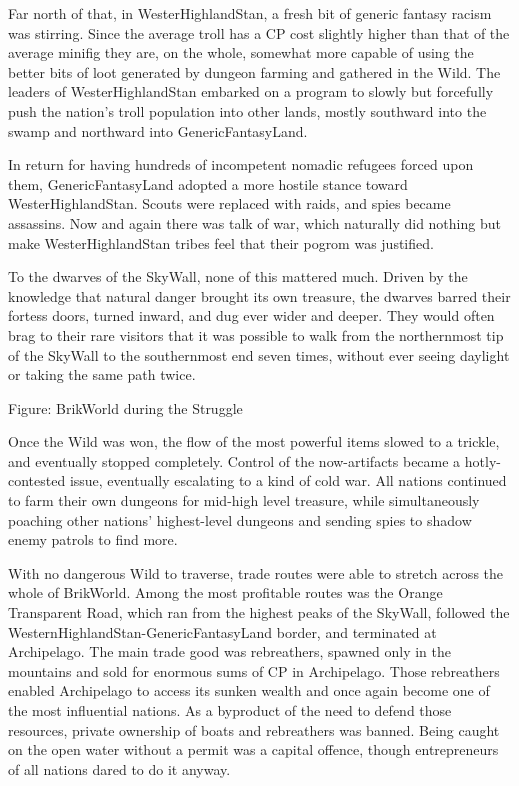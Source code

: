 \documentclass[12pt,a4paper,twocolumn]{article}
\begin{document}
Far north of that, in WesterHighlandStan, a fresh bit of generic fantasy racism was stirring.  Since the average troll has a CP cost slightly higher than that of the average minifig they are, on the whole, somewhat more capable of using the better bits of loot generated by dungeon farming and gathered in the Wild.  The leaders of WesterHighlandStan embarked on a program to slowly but forcefully push the nation's troll population into other lands, mostly southward into the swamp and northward into GenericFantasyLand.

In return for having hundreds of incompetent nomadic refugees forced upon them, GenericFantasyLand adopted a more hostile stance toward WesterHighlandStan.  Scouts were replaced with raids, and spies became assassins.  Now and again there was talk of war, which naturally did nothing but make WesterHighlandStan tribes feel that their pogrom was justified.

To the dwarves of the SkyWall, none of this mattered much.  Driven by the knowledge that natural danger brought its own treasure, the dwarves barred their fortess doors, turned inward, and dug ever wider and deeper.  They would often brag to their rare visitors that it was possible to walk from the northernmost tip of the SkyWall to the southernmost end seven times, without ever seeing daylight or taking the same path twice.

Figure: BrikWorld during the Struggle

Once the Wild was won, the flow of the most powerful items slowed to a trickle, and eventually stopped completely.  Control of the now-artifacts became a hotly-contested issue, eventually escalating to a kind of cold war.  All nations continued to farm their own dungeons for mid-high level treasure, while simultaneously poaching other nations' highest-level dungeons and sending spies to shadow enemy patrols to find more.  

With no dangerous Wild to traverse, trade routes were able to stretch across the whole of BrikWorld.  Among the most profitable routes was the Orange Transparent Road, which ran from the highest peaks of the SkyWall, followed the WesternHighlandStan-GenericFantasyLand border, and  terminated at Archipelago.  The main trade good was rebreathers, spawned only in the mountains and sold for enormous sums of CP in Archipelago.  Those rebreathers enabled Archipelago to access its sunken wealth and once again become one of the most influential nations.  As a byproduct of the need to defend those resources, private ownership of boats and rebreathers was banned.  Being caught on the open water without a permit was a capital offence, though entrepreneurs of all nations dared to do it anyway.
\end{document}
